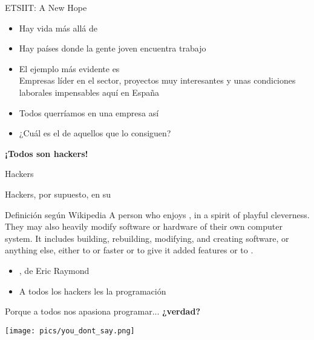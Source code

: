 \documentclass[14pt]{beamer}
\newcommand{\WebLink}[2]{
  \href{#1}{\structure{\PointingHand~\color{sail-green}{#2}}}
}
\begin{document}
\begin{frame}{ETSIIT: A New Hope}
  \begin{itemize}
    \item Hay vida más allá de 
    \item Hay países donde la gente joven encuentra trabajo
    \item El ejemplo más evidente es  \\
      {\small Empresas líder en el sector, proyectos muy interesantes
        y unas condiciones laborales impensables aquí en España}
    \item Todos querríamos  en una empresa así
    \item ¿Cuál es el  de aquellos que lo consiguen?
  \end{itemize}
  \begin{center} \Large \bf ¡Todos son hackers!\end{center}
\end{frame}


\begin{frame}{Hackers}
    \begin{center}
      Hackers, por supuesto, en su 
    \end{center}

    \begin{block}{\footnotesize Definición según Wikipedia}
      \centering \footnotesize A person who enjoys , in a spirit of playful
      cleverness. They may also heavily modify software or hardware of
      their own computer system. It includes building, rebuilding,
      modifying, and creating software, or anything else, either to
       or faster or to give it added
      features or to .
    \end{block}

  \begin{itemize}
    \item \WebLink{http://www.catb.org/esr/faqs/hacker-howto.html}
                  {How To Become A Hacker}, de Eric Raymond
    \item A todos los hackers les  la programación
  \end{itemize}
\end{frame}


\begin{frame}{}
  \vspace{2cm}
  \begin{alertblock}{}
    \centering Porque a todos nos apasiona programar... \textbf{¿verdad?}
  \end{alertblock}
  \begin{center}
    \texttt{[image: pics/you\_dont\_say.png]}
  \end{center}
\end{frame}
\end{document}
